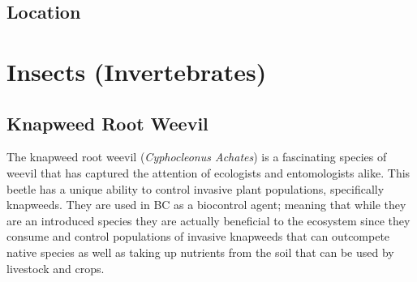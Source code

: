 \documentclass[
]{book}
\begin{document}
\hypertarget{location}{%
\section{Location}\label{location}}

\hypertarget{insects-invertebrates}{%
\chapter{Insects (Invertebrates)}\label{insects-invertebrates}}

\hypertarget{knapweed-root-weevil}{%
\section{Knapweed Root Weevil}\label{knapweed-root-weevil}}

The knapweed root weevil (\emph{Cyphocleonus Achates}) is a fascinating species of weevil that has captured the attention of ecologists and entomologists alike. This beetle has a unique ability to control invasive plant populations, specifically knapweeds. They are used in BC as a biocontrol agent; meaning that while they are an introduced species they are actually beneficial to the ecosystem since they consume and control populations of invasive knapweeds that can outcompete native species as well as taking up nutrients from the soil that can be used by livestock and crops.
\end{document}
